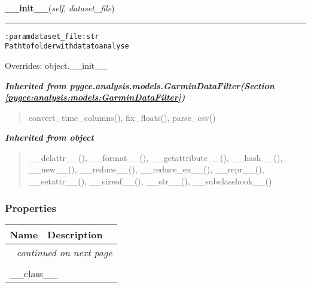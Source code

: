 \hspace{.8\funcindent}\begin{boxedminipage}{\funcwidth}

    \raggedright \textbf{\_\_init\_\_}(\textit{self}, \textit{dataset\_file})

    \vspace{-1.5ex}

    \rule{\textwidth}{0.5\fboxrule}
\setlength{\parskip}{2ex}
\begin{alltt}

:param dataset\_file: str
    Path to folder with data to analyse
\end{alltt}

\setlength{\parskip}{1ex}
      Overrides: object.\_\_init\_\_

    \end{boxedminipage}


\large{\textbf{\textit{Inherited from pygce.analysis.models.GarminDataFilter\textit{(Section \ref{pygce:analysis:models:GarminDataFilter})}}}}

\begin{quote}
convert\_time\_columns(), fix\_floats(), parse\_csv()
\end{quote}

\large{\textbf{\textit{Inherited from object}}}

\begin{quote}
\_\_delattr\_\_(), \_\_format\_\_(), \_\_getattribute\_\_(), \_\_hash\_\_(), \_\_new\_\_(), \_\_reduce\_\_(), \_\_reduce\_ex\_\_(), \_\_repr\_\_(), \_\_setattr\_\_(), \_\_sizeof\_\_(), \_\_str\_\_(), \_\_subclasshook\_\_()
\end{quote}


  \subsubsection{Properties}

    \vspace{-1cm}
\hspace{\varindent}\begin{longtable}{|p{\varnamewidth}|p{\vardescrwidth}|l}
\cline{1-2}
\cline{1-2} \centering \textbf{Name} & \centering \textbf{Description}& \\
\cline{1-2}
\endhead\cline{1-2}\multicolumn{3}{r}{\small\textit{continued on next page}}\\\endfoot\cline{1-2}
\endlastfoot\multicolumn{2}{|l|}{\textit{Inherited from object}}\\
\multicolumn{2}{|p{\varwidth}|}{\raggedright \_\_class\_\_}\\
\cline{1-2}
\end{longtable}

